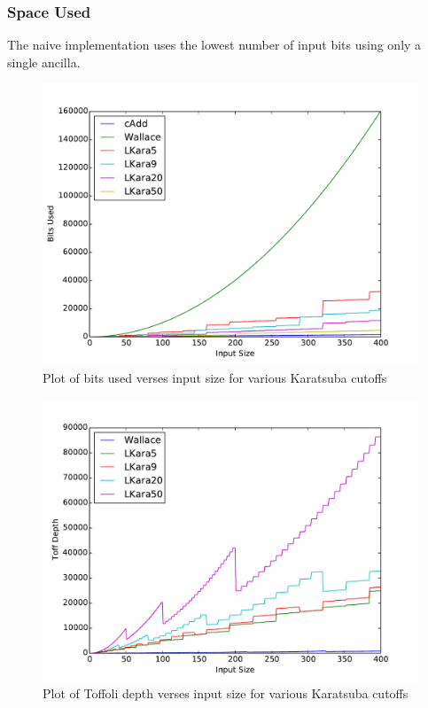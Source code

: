     \subsubsection{Space Used}
      The naive implementation uses the lowest number of input bits using only a single ancilla.
      \begin{figure}
        \capstart
        \includegraphics[width=\textwidth]{images/LKaraSize} 
        \caption{Plot of bits used verses input size for various Karatsuba cutoffs}
        \label{fig:size}
      \end{figure}
      \begin{figure}
        \capstart
        \includegraphics[width=\textwidth]{images/LKaraDepth2} 
        \caption{Plot of Toffoli depth verses input size for various Karatsuba cutoffs}
        \label{fig:depth}
      \end{figure}

